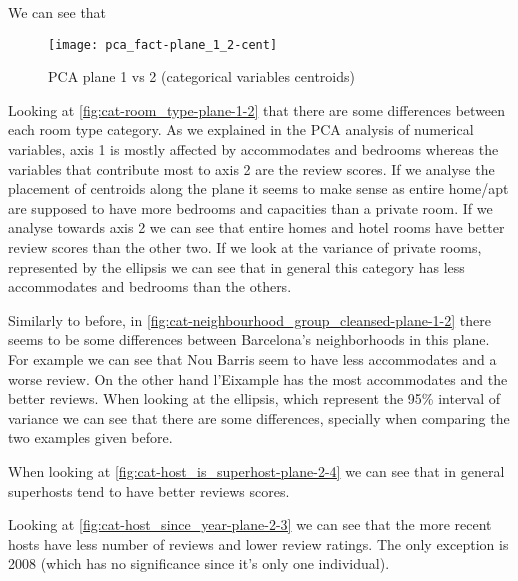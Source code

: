 \begin{landscape}

We can see that

\begin{figure}[H]
    \centering
    \texttt{[image: pca\_fact-plane\_1\_2-cent]}
    \caption{PCA plane 1 vs 2 (categorical variables centroids)}%
    \label{fig:plane_1-2-cent-}
\end{figure}


Looking at \cref{fig:cat-room_type-plane-1-2} that there are some 
differences between each room type category. As we explained in the PCA analysis of numerical variables, axis 1 is mostly affected by accommodates and bedrooms whereas the variables that contribute most to axis 2 are the review scores. If we analyse the
placement of centroids along the plane it seems to make sense as entire home/apt are supposed to have more bedrooms and capacities than a private room. If we analyse towards axis 2 we can see that entire homes and hotel rooms have better review scores than the 
other two. If we look at the variance of private rooms, represented by the ellipsis we 
can see that in general this category has less accommodates and bedrooms than the others.



Similarly to before, in \cref{fig:cat-neighbourhood_group_cleansed-plane-1-2} there seems to be some differences between Barcelona's neighborhoods in this plane. For example we can 
see that Nou Barris seem to have less accommodates and a worse review. On the other
hand l'Eixample has the most accommodates and the better reviews. When looking at
the ellipsis, which represent the 95\% interval of variance we can see that there are
some differences, specially when comparing the two examples given before. 

When looking at \cref{fig:cat-host_is_superhost-plane-2-4} we can
see that in general superhosts tend to have better reviews scores.

Looking at \cref{fig:cat-host_since_year-plane-2-3} we can see that the more recent hosts have less number of
reviews and lower review ratings.
The only exception is 2008 (which has no significance since it's only one individual).

\end{landscape}

